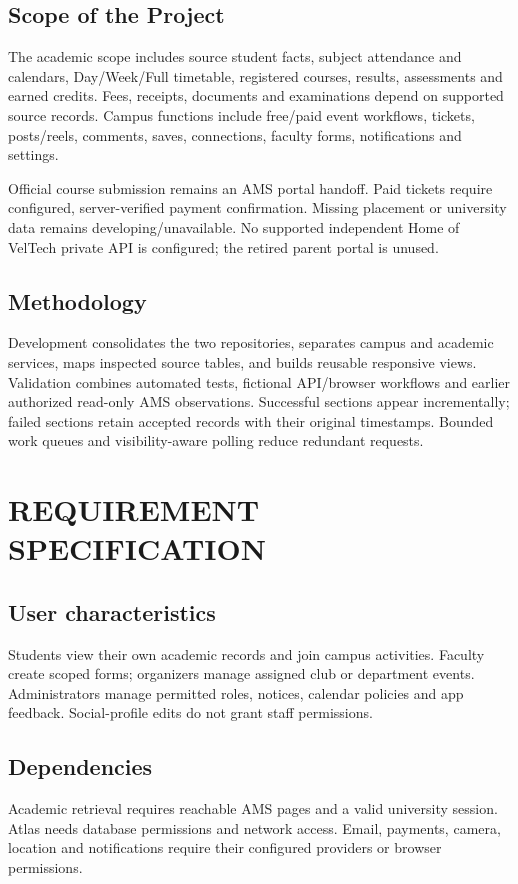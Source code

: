 \documentclass[10pt]{report}
\begin{document}
\section{Scope of the Project}
The academic scope includes source student facts, subject attendance and calendars, Day/Week/Full timetable, registered courses, results, assessments and earned credits. Fees, receipts, documents and examinations depend on supported source records. Campus functions include free/paid event workflows, tickets, posts/reels, comments, saves, connections, faculty forms, notifications and settings.

Official course submission remains an AMS portal handoff. Paid tickets require configured, server-verified payment confirmation. Missing placement or university data remains developing/unavailable. No supported independent Home of VelTech private API is configured; the retired parent portal is unused.

\section{Methodology}
Development consolidates the two repositories, separates campus and academic services, maps inspected source tables, and builds reusable responsive views. Validation combines automated tests, fictional API/browser workflows and earlier authorized read-only AMS observations. Successful sections appear incrementally; failed sections retain accepted records with their original timestamps. Bounded work queues and visibility-aware polling reduce redundant requests.

\chapter{REQUIREMENT SPECIFICATION}
\section{User characteristics}
Students view their own academic records and join campus activities. Faculty create scoped forms; organizers manage assigned club or department events. Administrators manage permitted roles, notices, calendar policies and app feedback. Social-profile edits do not grant staff permissions.

\section{Dependencies}
Academic retrieval requires reachable AMS pages and a valid university session. Atlas needs database permissions and network access\cite{mongo}. Email, payments, camera, location and notifications require their configured providers or browser permissions.
\end{document}
